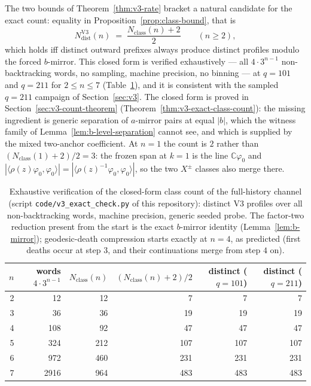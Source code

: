 \documentclass[11pt]{article}
\newcommand{\NdistV}{N^{\mathrm{V3}}_{\mathrm{dist}}}
\newcommand{\Nclass}{N_{\mathrm{class}}}
\begin{document}
The two bounds of Theorem~\ref{thm:v3-rate} bracket a natural candidate for the exact count: equality in
Proposition~\ref{prop:class-bound}, that is
\[
\NdistV(n)\;=\;\frac{\Nclass(n)+2}{2}
\qquad (n\ge2),
\]
which holds iff distinct outward prefixes always produce distinct profiles modulo the forced $b$-mirror.
This closed form is verified exhaustively --- all $4\cdot3^{n-1}$ non-backtracking words, no sampling,
machine precision, no binning --- at $q=101$ and $q=211$ for $2\le n\le7$ (Table~\ref{tab:v3-count}), and
it is consistent with the sampled $q=211$ campaign of Section~\ref{sec:v3}.
The closed form is proved in Section~\ref{sec:v3-count-theorem} (Theorem~\ref{thm:v3-exact-class-count}): the
missing ingredient is generic separation of $a$-mirror pairs at equal $|b|$, which the witness family of
Lemma~\ref{lem:b-level-separation} cannot see, and which is supplied by the mixed two-anchor coefficient.
At $n=1$ the count is $2$ rather than $(\Nclass(1)+2)/2=3$: the frozen span at $k=1$ is the line
$\mathbb{C}\varphi_0$ and $|\langle\rho(z)\varphi_0,\varphi_0\rangle|=
|\langle\rho(z)^{-1}\varphi_0,\varphi_0\rangle|$, so the two $X^{\pm}$ classes also merge there.

\begin{table}[t]
\centering
\begin{tabular}{rrrrrr}
\toprule
$n$ & words $4\cdot3^{n-1}$ & $\Nclass(n)$ & $(\Nclass(n)+2)/2$ & distinct ($q=101$) & distinct ($q=211$) \\
\midrule
2 & 12 & 12 & 7 & 7 & 7 \\
3 & 36 & 36 & 19 & 19 & 19 \\
4 & 108 & 92 & 47 & 47 & 47 \\
5 & 324 & 212 & 107 & 107 & 107 \\
6 & 972 & 460 & 231 & 231 & 231 \\
7 & 2916 & 964 & 483 & 483 & 483 \\
\bottomrule
\end{tabular}
\caption{Exhaustive verification of the closed-form class count of the full-history channel (script
\texttt{code/v3\_exact\_check.py} of this repository):
distinct V3 profiles over all non-backtracking words, machine precision, generic seeded probe.
The factor-two reduction present from the start is the exact $b$-mirror identity
(Lemma~\ref{lem:b-mirror}); geodesic-death compression starts exactly at $n=4$, as predicted
(first deaths occur at step $3$, and their continuations merge from step $4$ on).}
\label{tab:v3-count}
\end{table}
\end{document}
